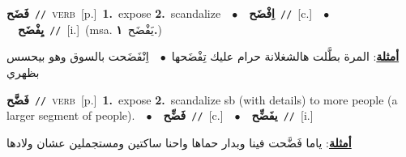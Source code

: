 \documentclass[10pt,a4paper,twoside]{article} %
\begin{document}
\begin{multicols}{2}
{\setlength\topsep{0pt}\textbf{\foreignlanguage{arabic}{فَضَح}}\ {\color{gray}\texttt{//}\color{black}}\ \textsc{verb}\ [p.]\ \textbf{1.}~expose  \textbf{2.}~scandalize\ \ $\bullet$\ \ \setlength\topsep{0pt}\textbf{\foreignlanguage{arabic}{اِفْضَح}}\ {\color{gray}\texttt{//}\color{black}}\ [c.]\ \ $\bullet$\ \ \setlength\topsep{0pt}\textbf{\foreignlanguage{arabic}{يِفْضَح}}\ {\color{gray}\texttt{//}\color{black}}\ [i.]\ \color{gray}(msa. \foreignlanguage{arabic}{يَفْضَح}~\foreignlanguage{arabic}{\textbf{١.}})\color{black}\  \begin{flushright}\color{gray}\foreignlanguage{arabic}{\textbf{\underline{\foreignlanguage{arabic}{أمثلة}}}: المرة بطَّلت هالشغلانة حرام عليك تِفْضَحها\ $\bullet$\ \  اِنْفَضَحت بالسوق وهو بيحسس بظهري}\end{flushright}\color{black}} \vspace{2mm}

{\setlength\topsep{0pt}\textbf{\foreignlanguage{arabic}{فَضَّح}}\ {\color{gray}\texttt{//}\color{black}}\ \textsc{verb}\ [p.]\ \textbf{1.}~expose  \textbf{2.}~scandalize sb (with details) to more people (a larger segment of people).\ \ $\bullet$\ \ \setlength\topsep{0pt}\textbf{\foreignlanguage{arabic}{فَضِّح}}\ {\color{gray}\texttt{//}\color{black}}\ [c.]\ \ $\bullet$\ \ \setlength\topsep{0pt}\textbf{\foreignlanguage{arabic}{يفَضِّح}}\ {\color{gray}\texttt{//}\color{black}}\ [i.]\  \begin{flushright}\color{gray}\foreignlanguage{arabic}{\textbf{\underline{\foreignlanguage{arabic}{أمثلة}}}: ياما فَضَّحت فينا وبدار حماها واحنا ساكتين ومستجملين عشان ولادها}\end{flushright}\color{black}} \vspace{2mm}


\end{multicols}
\end{document}
